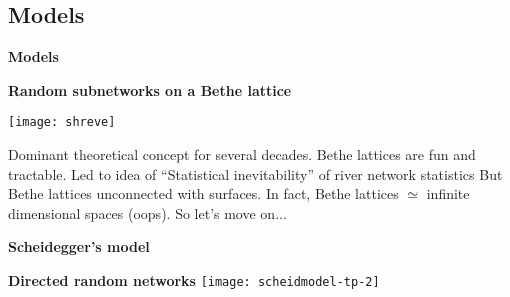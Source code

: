 \begin{frame}[label=]
\begin{frame}[label=]
\begin{frame}[label=]
\begin{frame}[label=]
\begin{frame}[label=]
\begin{frame}[label=]
\begin{frame}[label=]
\begin{frame}[label=]
\begin{frame}[label=]
\begin{frame}[label=]
\begin{frame}[label=]
\begin{frame}[label=]
\begin{frame}[label=]
\begin{frame}[label=]
\begin{frame}[label=]
\begin{frame}[label=]
\begin{frame}[label=]
\begin{frame}[label=]
\begin{frame}[label=]
\begin{frame}[label=]
\begin{frame}[label=]
\begin{frame}[label=]
\begin{frame}[label=]
\begin{frame}[label=]
\begin{frame}[label=]
\begin{frame}[label=]
\begin{frame}[label=]
\begin{frame}[label=]
\begin{frame}[label=]
\begin{frame}[label=]
\begin{frame}[label=]
\begin{frame}[label=]
\begin{frame}[label=]
\begin{frame}[label=]
\begin{frame}[label=]
\begin{frame}[label=]
\begin{frame}[label=]
\begin{frame}[label=]
\begin{frame}[label=]
\begin{frame}[label=]
\begin{frame}[label=]
\begin{frame}[label=]
\begin{frame}[label=]
\begin{frame}[label=]
\begin{frame}[label=]
\begin{frame}[label=]
\begin{frame}[label=]
\begin{frame}[label=]
\begin{frame}[label=]
\begin{frame}[label=]
\begin{frame}[label=]
\begin{frame}[label=]
\begin{frame}[label=]
\begin{frame}[label=]
\begin{frame}[label=]
\begin{frame}[label=]
\begin{frame}[label=]
\begin{frame}[label=]
\begin{frame}[label=]
\begin{frame}[label=]
\section{Models}

\begin{frame}[label=]
  \textbf{Models}

  \textbf{Random subnetworks on a Bethe lattice\cite{shreve1967a}}
          
      \texttt{[image: shreve]}
      
      
       Dominant theoretical concept for several decades.
       Bethe lattices are fun and tractable.
       Led to idea of ``Statistical inevitability'' of river network statistics\cite{kirchner1993a}
       But Bethe lattices unconnected with surfaces.
       In fact, Bethe lattices $\simeq$ infinite dimensional spaces (oops).
       So let's move on...
      
      


\begin{frame}[label=]
  \textbf{Scheidegger's model}

  \textbf{Directed random networks\cite{scheidegger1967a,scheidegger1991a}}
    \texttt{[image: scheidmodel-tp-2]}
    

\end{frame}
\end{frame}
\end{frame}
\end{frame}
\end{frame}
\end{frame}
\end{frame}
\end{frame}
\end{frame}
\end{frame}
\end{frame}
\end{frame}
\end{frame}
\end{frame}
\end{frame}
\end{frame}
\end{frame}
\end{frame}
\end{frame}
\end{frame}
\end{frame}
\end{frame}
\end{frame}
\end{frame}
\end{frame}
\end{frame}
\end{frame}
\end{frame}
\end{frame}
\end{frame}
\end{frame}
\end{frame}
\end{frame}
\end{frame}
\end{frame}
\end{frame}
\end{frame}
\end{frame}
\end{frame}
\end{frame}
\end{frame}
\end{frame}
\end{frame}
\end{frame}
\end{frame}
\end{frame}
\end{frame}
\end{frame}
\end{frame}
\end{frame}
\end{frame}
\end{frame}
\end{frame}
\end{frame}
\end{frame}
\end{frame}
\end{frame}
\end{frame}
\end{frame}
\end{frame}
\end{frame}
\end{frame}
